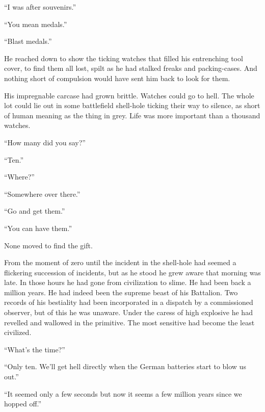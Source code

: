 ``I was after souvenirs.''

``You mean medals.''

``Blast medals.''

He reached down to show the ticking watches that filled his entrenching tool cover, to find them all lost, spilt as he had stalked freaks and packing-cases. And nothing short of compulsion would have sent him back to look for them.

His impregnable carcase had grown brittle. Watches could go to hell. The whole lot could lie out in some battlefield shell-hole ticking their way to silence, as short of human meaning as the thing in grey. Life was more important than a thousand watches.

``How many did you say?''

``Ten.''

``Where?''

``Somewhere over there.''

``Go and get them.''

``You can have them.''

None moved to find the gift.

From the moment of zero until the incident in the shell-hole had seemed a flickering succession of incidents, but as he stood he grew aware that morning was late. In those hours he had gone from civilization to slime. He had been back a million years. He had indeed been the supreme beast of his Battalion. Two records of his bestiality had been incorporated in a dispatch by a commissioned observer, but of this he was unaware. Under the caress of high explosive he had revelled and wallowed in the primitive. The most sensitive had become the least civilized.

``What's the time?''

``Only ten. We'll get hell directly when the German batteries start to blow us out.''

``It seemed only a few seconds but now it seems a few million years since we hopped off.''
